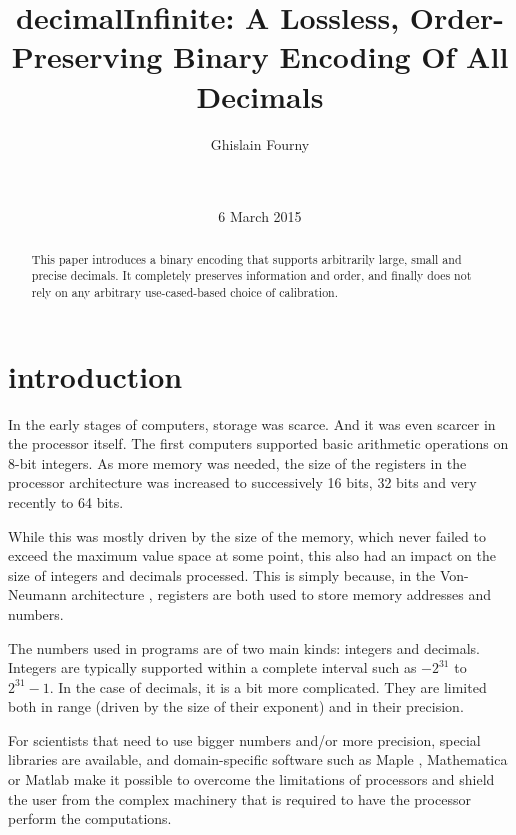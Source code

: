 \documentclass{acm_proc_article-sp}
\begin{document}
\title{decimalInfinite: A Lossless, Order-Preserving Binary Encoding Of All Decimals}


\author{
\alignauthor
Ghislain Fourny\\
       \\
       \\
}
\date{6 March 2015}
\maketitle

\begin{abstract}
This paper introduces a binary encoding that supports arbitrarily large, small and precise decimals. It completely preserves information and order, and finally does not rely on any arbitrary use-cased-based choice of calibration.
\end{abstract}

\section{introduction}
In the early stages of computers, storage was scarce. And it was even scarcer in the processor itself. The first computers supported basic arithmetic operations on 8-bit integers. As more memory was needed, the size of the registers in the processor architecture was increased to successively 16 bits, 32 bits and very recently to 64 bits.

While this was mostly driven by the size of the memory, which never failed to exceed the maximum value space at some point, this also had an impact on the size of integers and decimals processed. This is simply because, in the Von-Neumann architecture \cite{VonNeumann1946}, registers are both used to store memory addresses and numbers.

The numbers used in programs are of two main kinds: integers and decimals. Integers are typically supported within a complete interval such as $- 2^{31}$ to $2^{31} -1$. In the case of decimals, it is a bit more complicated. They are limited both in range (driven by the size of their exponent) and in their precision.

For scientists that need to use bigger numbers and/or more precision, special libraries are available, and domain-specific software such as Maple \cite{MAPLE}, Mathematica \cite{MATHEMATICA} or Matlab \cite{MATLAB} make it possible to overcome the limitations of processors and shield the user from the complex machinery that is required to have the processor perform the computations.
\end{document}
